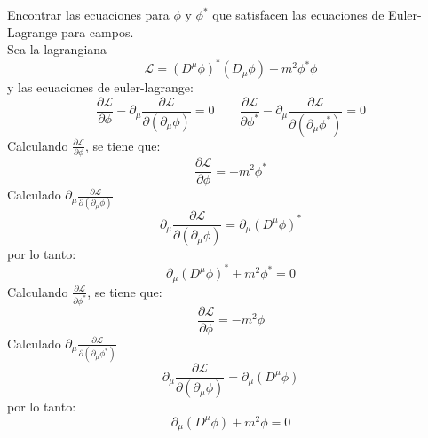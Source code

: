 \documentclass[12pt,letterpaper]{report}
\begin{document}
Encontrar las ecuaciones para $\phi$ y $\phi^*$ que satisfacen las ecuaciones de Euler-Lagrange para campos.\\
Sea la lagrangiana 
\begin{equation*}
     \mathcal{L}=\left(D^\mu \phi\right)^* \left(D_\mu \phi \right) -m^2\phi^* \phi
\end{equation*}
y las ecuaciones de euler-lagrange:
\begin{equation*}
    \frac{\partial \mathcal{L}}{\partial \phi} - \partial_\mu \frac{\partial \mathcal{L}}{\partial(\partial_\mu \phi)}=0 \qquad
    \frac{\partial \mathcal{L}}{\partial \phi^*} - \partial_\mu \frac{\partial \mathcal{L}}{\partial(\partial_\mu \phi^*)}=0
\end{equation*}
Calculando $\frac{\partial \mathcal{L}}{\partial \phi}$, se tiene que:
\begin{equation*}
    \frac{\partial \mathcal{L}}{\partial \phi} = -m^2\phi^*
\end{equation*}
Calculado $\partial_\mu \frac{\partial \mathcal{L}}{\partial(\partial_\mu \phi)}$
\begin{equation*}
    \partial_\mu \frac{\partial \mathcal{L}}{\partial(\partial_\mu \phi)} = \partial_\mu \left(D^\mu \phi\right)^*
\end{equation*}
por lo tanto:
\begin{equation*}
    \partial_\mu \left(D^\mu \phi\right)^*+ m^2\phi^* =0
\end{equation*}
Calculando $\frac{\partial \mathcal{L}}{\partial \phi^*}$, se tiene que:
\begin{equation*}
    \frac{\partial \mathcal{L}}{\partial \phi} = -m^2\phi
\end{equation*}
Calculado $\partial_\mu \frac{\partial \mathcal{L}}{\partial(\partial_\mu \phi^*)}$
\begin{equation*}
    \partial_\mu \frac{\partial \mathcal{L}}{\partial(\partial_\mu \phi)} = \partial_\mu \left(D^\mu \phi\right)
\end{equation*}
por lo tanto:
\begin{equation*}
    \partial_\mu \left(D^\mu \phi\right)+ m^2\phi =0
\end{equation*}
\end{document}
